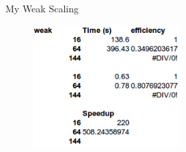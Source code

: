 \documentclass{beamer}
\begin{document}
\begin{frame}{My Weak Scaling}

  \begin{figure}[h!]
    \begin{center}
      \includegraphics[width=2.25in]{my_weak.png}
    \end{center}
  \end{figure}

\end{frame}

\end{document}

